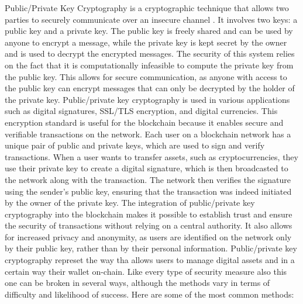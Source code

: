 \documentclass[target=mst,aauheader=]{thud}
\begin{document}
    Public/Private Key Cryptography is a cryptographic technique that allows two parties to securely communicate over an insecure channel \cite{elliptic}. It involves two keys: a public key and a private key. The public key is freely shared and can be used by anyone to encrypt a message, while the private key is kept secret by the owner and is used to decrypt the encrypted messages. The security of this system relies on the fact that it is computationally infeasible to compute the private key from the public key. This allows for secure communication, as anyone with access to the public key can encrypt messages that can only be decrypted by the holder of the private key. Public/private key cryptography is used in various applications such as digital signatures, SSL/TLS encryption, and digital currencies.
    This encryption standard is useful for the blockchain because it enables secure and verifiable transactions on the network. Each user on a blockchain network has a unique pair of public and private keys, which are used to sign and verify transactions.  When a user wants to transfer assets, such as cryptocurrencies, they use their private key to create a digital signature, which is then broadcasted to the network along with the transaction. The network then verifies the signature using the sender's public key, ensuring that the transaction was indeed initiated by the owner of the private key. The integration of public/private key cryptography into the blockchain makes it possible to establish trust and ensure the security of transactions without relying on a central authority. It also allows for increased privacy and anonymity, as users are identified on the network only by their public key, rather than by their personal information.
    Public/private key cryptography represet the way tha allows users to manage digital assets and in a certain way their wallet on-chain. Like every type of security measure also this one can be broken in several ways, although the methods vary in terms of difficulty and likelihood of success. Here are some of the most common methods:
\end{document}
